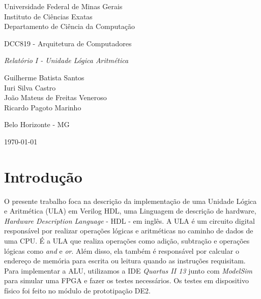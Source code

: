 \documentclass[11pt,a4paper,titlepage]{article}
\newcommand{\titulo}{\textit{Relatório I - Unidade Lógica Aritmética}}
\begin{document}
\begin{titlepage}
\begin{center}

\begin{large}
Universidade Federal de Minas Gerais\\
Instituto de Ciências Exatas\\
Departamento de Ciência da Computação\\
\end{large}

\vspace{20mm}

\begin{Large}
DCC819 - Arquitetura de Computadores
\end{Large}

\vspace{20mm}

\begin{LARGE}
\titulo
\end{LARGE}


\vspace{30mm}

\begin{Large}
\begin{center}
Guilherme Batista Santos\\ Iuri Silva Castro\\ João Mateus de Freitas Veneroso\\ Ricardo Pagoto Marinho \\
\end{center}
\end{Large}


\vspace{60mm}

{\sc Belo Horizonte - MG}

{\sc \today}

\end{center}
\end{titlepage}


\section{Introdução}\label{sec:intro}

O presente trabalho foca na descrição da implementação de uma Unidade Lógica e Aritmética (ULA) em Verilog HDL, uma Linguagem de descrição de hardware, \textit{Hardware Description Language} - HDL - em inglês.
A ULA é um circuito digital responsável por realizar operações lógicas e aritméticas no caminho de dados de uma CPU.
É a ULA que realiza operações como adição, subtração e operações lógicas como \textit{and} e \textit{or}.
Além disso, ela também é responsável por calcular o endereço de memória para escrita ou leitura quando as instruções requisitam.
Para implementar a ALU, utilizamos a IDE \textit{Quartus II 13} junto com \textit{ModelSim} para simular uma FPGA e fazer os testes necessários.
Os testes em dispositivo físico foi feito no módulo de prototipação DE2.
\end{document}
